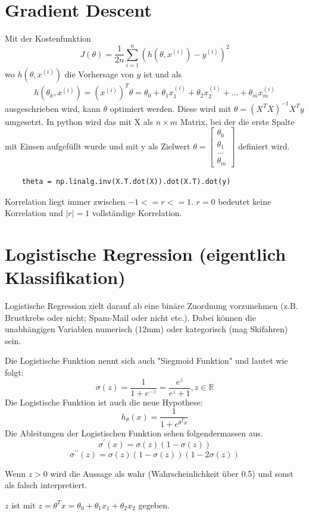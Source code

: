 \documentclass{article}
\begin{document}
\section{Gradient Descent}
	Mit der Kostenfunktion $$J(\theta) = \frac{1}{2 n} \sum_{i=1}^{n}(h(\theta,x^{(i)})-y^{(i)})^2$$ wo $h(\theta,x^{(i)})$ die Vorhersage von $y$ ist und als $$h(\theta_k,x^{(i)})= (x^{(i)})^T\theta=\theta_0+\theta_1x_1^{(i)}+\theta_2x_2^{(i)}+...+\theta_mx_m^{(i)}$$
	ausgeschrieben wird, kann $\theta$ optimiert werden.	
	Diese wird mit $\theta = (X^T X)^{-1} X^T y$ umgesetzt. 
	In python wird das mit X als $n \times m$ Matrix, bei der die erste Spalte mit Einsen aufgefüllt wurde und mit y als Zielwert
	$\theta = 
	\begin{bmatrix}
	\theta_0 \\[0.1pt] \theta_1 \\[0.1pt] ... \\[0.1pt] \theta_m
	\end{bmatrix}$ definiert wird.
	
	\begin{lstlisting}
	theta = np.linalg.inv(X.T.dot(X)).dot(X.T).dot(y)
	\end{lstlisting}
	
	Korrelation liegt immer zwischen $-1 <= r <= 1$.
	$r = 0$ bedeutet keine Korrelation und $|r| = 1$ vollständige Korrelation.
\section{Logistische Regression (eigentlich Klassifikation)}
	Logistische Regression zielt darauf ab eine binäre Zuordnung vorzunehmen (z.B. Brustkrebs oder nicht; Spam-Mail oder nicht etc.).
	Dabei können die unabhängigen Variablen numerisch (12mm) oder kategorisch (mag Skifahren) sein.
	
	Die Logistische Funktion nennt sich auch "Siegmoid Funktion" und lautet wie folgt:
	$$\sigma(z) = \frac{1}{1+e^{-z}} = \frac{e^z}{e^z+1}, z \in \mathbb{R}$$
	Die Logistische Funktion ist auch die neue Hypothese: $$h_\theta(x)=\frac{1}{1+e^{\theta^Tx}}$$
	Die Ableitungen der Logistischen Funktion sehen folgendermassen aus.
	$$\sigma^{\prime}(x) = \sigma(z) (1-\sigma(z))$$
	$$\sigma^{\prime\prime}(z)= \sigma(z)(1-\sigma(z))(1-2\sigma(z))$$
	
	Wenn $z > 0$ wird die Aussage als wahr (Wahrscheinlichkeit über 0.5) und sonst als falsch interpretiert.
	
	$z$ ist mit $z=\theta^T x = \theta_0 + \theta_1 x_1 + \theta_2 x_2$ gegeben.
	
\end{document}
